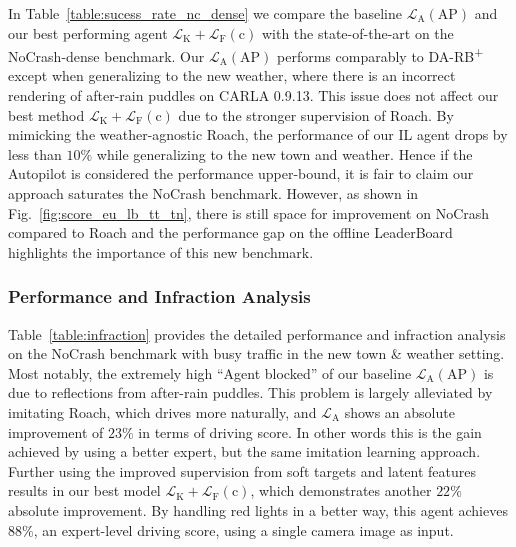 In Table~\ref{table:sucess_rate_nc_dense} we compare the baseline $\mathcal{L}_\text{A}(\text{AP})$ and our best performing agent $\mathcal{L}_\text{K}+\mathcal{L}_\text{F}(\text{c})$ with the state-of-the-art on the NoCrash-dense benchmark.
Our $\mathcal{L}_\text{A}(\text{AP})$ performs comparably to DA-RB\textsuperscript{+} except when generalizing to the new weather, where there is an incorrect rendering of after-rain puddles on CARLA 0.9.13.
This issue does not affect our best method $\mathcal{L}_\text{K}+\mathcal{L}_\text{F}(\text{c})$ due to the stronger supervision of Roach. 
By mimicking the weather-agnostic Roach, the performance of our IL agent drops by less than $10\%$ while generalizing to the new town and weather.
Hence if the Autopilot is considered the performance upper-bound, it is fair to claim our approach saturates the NoCrash benchmark.
However, as shown in Fig.~\ref{fig:score_eu_lb_tt_tn}, there is still space for improvement on NoCrash compared to Roach and the performance gap on the offline LeaderBoard highlights the importance of this new benchmark.


\subsubsection{Performance and Infraction Analysis}

Table~\ref{table:infraction} provides the detailed performance and infraction analysis on the NoCrash benchmark with busy traffic in the new town \& weather setting.
Most notably, the extremely high ``Agent blocked'' of our baseline $\mathcal{L}_\text{A}(\text{AP})$ is due to reflections from after-rain puddles.
This problem is largely alleviated by imitating Roach, which drives more naturally, and $\mathcal{L}_\text{A}$ shows an absolute improvement of $23\%$ in terms of driving score.
In other words this is the gain achieved by using a better expert, but the same imitation learning approach. 
Further using the improved supervision from soft targets and latent features results in our best model $\mathcal{L}_\text{K}+\mathcal{L}_\text{F}(\text{c})$, which demonstrates another $22\%$ absolute improvement.
By handling red lights in a better way, this agent achieves $88\%$, an expert-level driving score, using a single camera image as input.



 